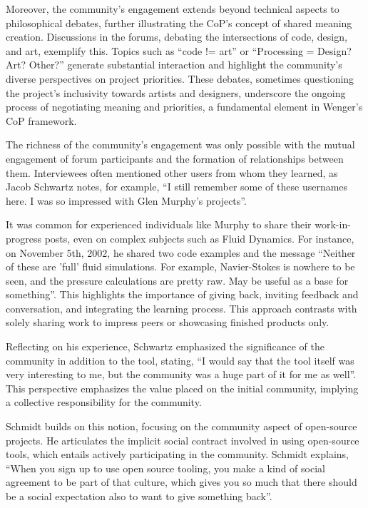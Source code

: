 Moreover, the community’s engagement extends beyond technical aspects to philosophical debates, further illustrating the CoP’s concept of shared meaning creation. Discussions in the forums, debating the intersections of code, design, and art, exemplify this. Topics such as \enquote{code != art} or \enquote{Processing = Design? Art? Other?} generate substantial interaction and highlight the community’s diverse perspectives on project priorities. These debates, sometimes questioning the project’s inclusivity towards artists and designers, underscore the ongoing process of negotiating meaning and priorities, a fundamental element in Wenger’s CoP framework.

The richness of the community’s engagement was only possible with the mutual engagement of forum participants and the formation of relationships between them.  Interviewees often mentioned other users from whom they learned, as Jacob Schwartz notes, for example, \enquote{I still remember some of these usernames here. I was so impressed with Glen Murphy’s projects}. 

It was common for experienced individuals like Murphy to share their work-in-progress posts, even on complex subjects such as Fluid Dynamics. For instance, on November 5th, 2002, he shared two code examples and the message \enquote{Neither of these are ’full’ fluid simulations. For example, Navier-Stokes is nowhere to be seen, and the pressure calculations are pretty raw. May be useful as a base for something}. This highlights the importance of giving back, inviting feedback and conversation, and integrating the learning process. This approach contrasts with solely sharing work to impress peers or showcasing finished products only.

Reflecting on his experience, Schwartz emphasized the significance of the community in addition to the tool, stating, \enquote{I would say that the tool itself was very interesting to me, but the community was a huge part of it for me as well}. This perspective emphasizes the value placed on the initial community, implying a collective responsibility for the community.

Schmidt builds on this notion, focusing on the community aspect of open-source projects. He articulates the implicit social contract involved in using open-source tools, which entails actively participating in the community. Schmidt explains, \enquote{When you sign up to use open source tooling, you make a kind of social agreement to be part of that culture, which gives you so much that there should be a social expectation also to want to give something back}.

